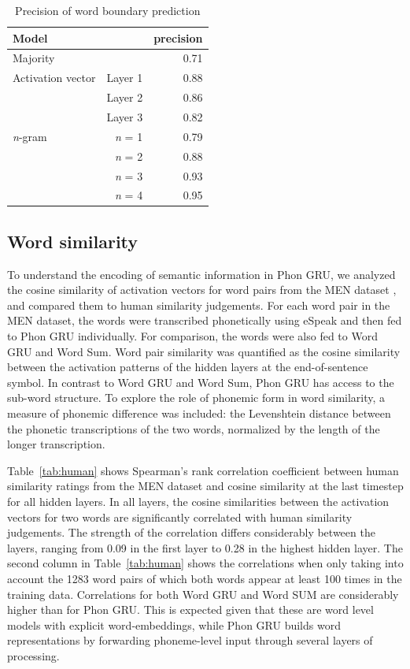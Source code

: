 \begin{table}[]
	\centering
	\begin{tabular}{lrr}
		Model & & precision \\\hline
                Majority & & 0.71 \\
		\hline
		Activation vector & Layer 1 & 0.88 \\
		& Layer 2 & 0.86 \\
		& Layer 3 & 0.82 \\
		\hline
		\textit{n}-gram & \textit{n} = 1 & 0.79 \\
		& \textit{n} = 2 & 0.88 \\
		& \textit{n} = 3 & 0.93 \\
		& \textit{n} = 4 & 0.95
	\end{tabular}
	\caption{Precision of word boundary prediction}
\label{tab:boundary}
\end{table}

\subsection{Word similarity}
To understand the encoding of semantic information in {\sc Phon GRU}, we analyzed the cosine similarity of activation vectors for word pairs from the MEN dataset \cite{bruni2014multimodal}, and compared them to human similarity judgements.
For each word pair in the MEN dataset, the words were transcribed phonetically using eSpeak and then fed to {\sc Phon GRU} individually. For comparison, the words were also fed to {\sc Word GRU} and {\sc Word Sum}. Word pair similarity was quantified as the cosine similarity between the activation patterns of the hidden layers at the end-of-sentence symbol.
In contrast to {\sc Word GRU} and {\sc Word Sum}, {\sc Phon GRU} has access to the sub-word structure. To explore the role of phonemic form in word similarity, a measure of phonemic difference was included: the Levenshtein distance between the phonetic transcriptions of the two words, normalized by  the length of the longer transcription. 

Table~\ref{tab:human} shows Spearman's rank correlation coefficient between human similarity ratings from the MEN dataset and cosine similarity at the last timestep for all hidden layers. In all layers, the cosine similarities between the activation vectors for two words are significantly correlated with human similarity judgements. The strength of the correlation differs considerably between the layers, ranging from 0.09 in the first layer to 0.28 in the highest hidden layer. The second column in Table~\ref{tab:human} shows the correlations when only taking into account the 1283 word pairs of which both words appear at least 100 times in the training data. 
Correlations for both {\sc Word GRU} and {\sc Word SUM} are considerably higher than for {\sc Phon GRU}. This is expected given that these are word level models with explicit word-embeddings, while {\sc Phon GRU} builds word representations by forwarding phoneme-level input through several layers of processing.

